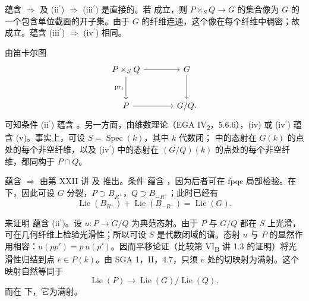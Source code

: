 蕴含 \textup{} \(\Rightarrow\) \textup{} 及 \textup{(ii\(^{\prime}\))} \(\Rightarrow\) \textup{(iii\(^{\prime}\))} 是直接的。若 \textup{} 成立，则 \(P\times_SQ\to G\) 的集合像为 \(G\) 的一个包含单位截面的开子集。由于 \(G\) 的纤维连通，这个像在每个纤维中稠密；故 \textup{} 成立。蕴含 \textup{(iii\(^{\prime}\))} \(\Rightarrow\) \textup{(iv\(^{\prime}\))} 相同。

由笛卡尔图
\[
\begin{tikzcd}[column sep=large,row sep=large]
 P\times_SQ \arrow[r] \arrow[d,"\operatorname{pr}_1"'] & G \arrow[d]\\
 P \arrow[r] & G/Q .
\end{tikzcd}
\]
可知条件 \textup{(ii\(^{\prime}\))} 蕴含 \textup{}。另一方面，由维数理论（EGA IV\textsubscript{2}，5.6.6），\textup{(iv)} 或 \textup{(iv\(^{\prime}\))} 蕴含 \textup{(v)}。事实上，可设 \(S=\operatorname{Spec}(k)\)，其中 \(k\) 代数闭；\textup{} 中的态射在 \(G(k)\) 的点处的每个非空纤维，以及 \textup{(iv\(^{\prime}\))} 中的态射在 \((G/Q)(k)\) 的点处的每个非空纤维，都同构于 \(P\cap Q\)。

蕴含 \textup{} \(\Rightarrow\) \textup{} 由第 XXII 讲 \textup{} 及  推出。条件 \textup{} 蕴含 \textup{}，因为后者可在 fpqc 局部检验。在 \textup{} 下，因此可设 \(G\) 分裂，\(P\supset B_{R^+}\)，\(Q\supset B_{-R^+}\)；此时已经有
\[
 \operatorname{Lie}(B_{R^+})+\operatorname{Lie}(B_{-R^+})
 =\operatorname{Lie}(G).
\]

来证明 \textup{} 蕴含 \textup{(ii\(^{\prime}\))}。设 \(u:P\to G/Q\) 为典范态射。由于 \(P\) 与 \(G/Q\) 都在 \(S\) 上光滑，可在几何纤维上检验光滑性；所以可设 \(S\) 是代数闭域的谱。态射 \(u\) 与 \(P\) 的显然作用相容：\(u(pp')=p\,u(p')\)。因而平移论证（比较第 VI\textsubscript{B} 讲 1.3 的证明）将光滑性归结到点 \(e\in P(k)\)。由 SGA 1，II，4.7，只须 \(e\) 处的切映射为满射。这个映射自然等同于
\[
 \operatorname{Lie}(P)\longrightarrow
 \operatorname{Lie}(G)/\operatorname{Lie}(Q),
\]
而在 \textup{} 下，它为满射。

